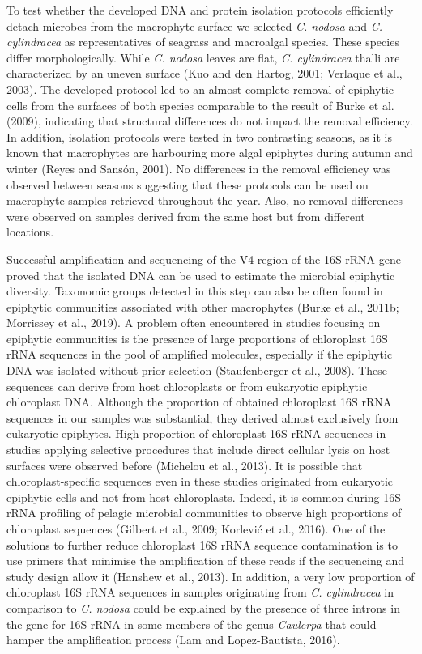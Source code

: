 \documentclass[12pt,]{article}
\begin{document}
To test whether the developed DNA and protein isolation protocols
efficiently detach microbes from the macrophyte surface we selected
\emph{C. nodosa} and \emph{C. cylindracea} as representatives of
seagrass and macroalgal species. These species differ morphologically.
While \emph{C. nodosa} leaves are flat, \emph{C. cylindracea} thalli are
characterized by an uneven surface (Kuo and den Hartog, 2001; Verlaque
et al., 2003). The developed protocol led to an almost complete removal
of epiphytic cells from the surfaces of both species comparable to the
result of Burke et al. (2009), indicating that structural differences do
not impact the removal efficiency. In addition, isolation protocols were
tested in two contrasting seasons, as it is known that macrophytes are
harbouring more algal epiphytes during autumn and winter (Reyes and
Sansón, 2001). No differences in the removal efficiency was observed
between seasons suggesting that these protocols can be used on
macrophyte samples retrieved throughout the year. Also, no removal
differences were observed on samples derived from the same host but from
different locations.

Successful amplification and sequencing of the V4 region of the 16S rRNA
gene proved that the isolated DNA can be used to estimate the microbial
epiphytic diversity. Taxonomic groups detected in this step can also be
often found in epiphytic communities associated with other macrophytes
(Burke et al., 2011b; Morrissey et al., 2019). A problem often
encountered in studies focusing on epiphytic communities is the presence
of large proportions of chloroplast 16S rRNA sequences in the pool of
amplified molecules, especially if the epiphytic DNA was isolated
without prior selection (Staufenberger et al., 2008). These sequences
can derive from host chloroplasts or from eukaryotic epiphytic
chloroplast DNA. Although the proportion of obtained chloroplast 16S
rRNA sequences in our samples was substantial, they derived almost
exclusively from eukaryotic epiphytes. High proportion of chloroplast
16S rRNA sequences in studies applying selective procedures that include
direct cellular lysis on host surfaces were observed before (Michelou et
al., 2013). It is possible that chloroplast-specific sequences even in
these studies originated from eukaryotic epiphytic cells and not from
host chloroplasts. Indeed, it is common during 16S rRNA profiling of
pelagic microbial communities to observe high proportions of chloroplast
sequences (Gilbert et al., 2009; Korlević et al., 2016). One of the
solutions to further reduce chloroplast 16S rRNA sequence contamination
is to use primers that minimise the amplification of these reads if the
sequencing and study design allow it (Hanshew et al., 2013). In
addition, a very low proportion of chloroplast 16S rRNA sequences in
samples originating from \emph{C. cylindracea} in comparison to \emph{C.
nodosa} could be explained by the presence of three introns in the gene
for 16S rRNA in some members of the genus \emph{Caulerpa} that could
hamper the amplification process (Lam and Lopez-Bautista, 2016).
\end{document}
